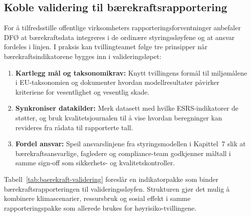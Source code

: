 \subsection{Koble validering til bærekraftsrapportering}
For å tilfredsstille offentlige virksomheters rapporteringsforventninger anbefaler DFØ at bærekraftsdata integreres i de ordinære styringssløyfene og at ansvar fordeles i linjen.\citep{dfo2023baerekraft} I praksis kan tvillingteamet følge tre prinsipper når bærekraftsindikatorene bygges inn i valideringsløpet:
\begin{enumerate}
    \item \textbf{Kartlegg mål og taksonomikrav:} Knytt tvillingens formål til miljømålene i EU-taksonomien og dokumenter hvordan modellresultater påvirker kriteriene for vesentlighet og vesentlig skade.
    \item \textbf{Synkroniser datakilder:} Merk datasett med hvilke ESRS-indikatorer de støtter, og bruk kvalitetsjournalen til å vise hvordan beregninger kan revideres fra rådata til rapporterte tall.
    \item \textbf{Fordel ansvar:} Speil ansvarslinjene fra styringsmodellen i Kapittel~7 slik at bærekraftsansvarlige, fagledere og compliance-team godkjenner måltall i samme sign-off som sikkerhets- og kvalitetskontroller.
\end{enumerate}

Tabell~\ref{tab:baerekraft-validering} foreslår en indikatorpakke som binder bærekraftsrapporteringen til valideringssløyfen. Strukturen gjør det mulig å kombinere klimascenarier, ressursbruk og sosial effekt i samme rapporteringspakke som allerede brukes for høyrisiko-tvillingene.

